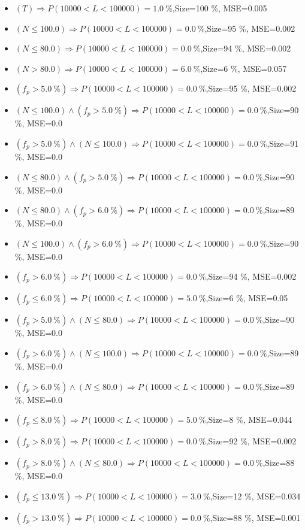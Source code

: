 \documentclass[numbered]{CSL}
\begin{document}
\begin{itemize}
\item $(T) \Rightarrow P(10 000 < L < 100 000) = 1.0~\%$,\hfill Size=100 \%, MSE=0.005
\item $(N \leq 100.0) \Rightarrow P(10 000 < L < 100 000) = 0.0~\%$,\hfill Size=95 \%, MSE=0.002
\item $(N \leq 80.0) \Rightarrow P(10 000 < L < 100 000) = 0.0~\%$,\hfill Size=94 \%, MSE=0.002
\item $(N > 80.0) \Rightarrow P(10 000 < L < 100 000) = 6.0~\%$,\hfill Size=6 \%, MSE=0.057
\item $(f_p > 5.0~\%) \Rightarrow P(10 000 < L < 100 000) = 0.0~\%$,\hfill Size=95 \%, MSE=0.002
\item $(N \leq 100.0) \land (f_p > 5.0~\%) \Rightarrow P(10 000 < L < 100 000) = 0.0~\%$,\hfill Size=90 \%, MSE=0.0
\item $(f_p > 5.0~\%) \land (N \leq 100.0) \Rightarrow P(10 000 < L < 100 000) = 0.0~\%$,\hfill Size=91 \%, MSE=0.0
\item $(N \leq 80.0) \land (f_p > 5.0~\%) \Rightarrow P(10 000 < L < 100 000) = 0.0~\%$,\hfill Size=90 \%, MSE=0.0
\item $(N \leq 80.0) \land (f_p > 6.0~\%) \Rightarrow P(10 000 < L < 100 000) = 0.0~\%$,\hfill Size=89 \%, MSE=0.0
\item $(N \leq 100.0) \land (f_p > 6.0~\%) \Rightarrow P(10 000 < L < 100 000) = 0.0~\%$,\hfill Size=90 \%, MSE=0.0
\item $(f_p > 6.0~\%) \Rightarrow P(10 000 < L < 100 000) = 0.0~\%$,\hfill Size=94 \%, MSE=0.002
\item $(f_p \leq 6.0~\%) \Rightarrow P(10 000 < L < 100 000) = 5.0~\%$,\hfill Size=6 \%, MSE=0.05
\item $(f_p > 5.0~\%) \land (N \leq 80.0) \Rightarrow P(10 000 < L < 100 000) = 0.0~\%$,\hfill Size=90 \%, MSE=0.0
\item $(f_p > 6.0~\%) \land (N \leq 100.0) \Rightarrow P(10 000 < L < 100 000) = 0.0~\%$,\hfill Size=89 \%, MSE=0.0
\item $(f_p > 6.0~\%) \land (N \leq 80.0) \Rightarrow P(10 000 < L < 100 000) = 0.0~\%$,\hfill Size=89 \%, MSE=0.0
\item $(f_p \leq 8.0~\%) \Rightarrow P(10 000 < L < 100 000) = 5.0~\%$,\hfill Size=8 \%, MSE=0.044
\item $(f_p > 8.0~\%) \Rightarrow P(10 000 < L < 100 000) = 0.0~\%$,\hfill Size=92 \%, MSE=0.002
\item $(f_p > 8.0~\%) \land (N \leq 80.0) \Rightarrow P(10 000 < L < 100 000) = 0.0~\%$,\hfill Size=88 \%, MSE=0.0
\item $(f_p \leq 13.0~\%) \Rightarrow P(10 000 < L < 100 000) = 3.0~\%$,\hfill Size=12 \%, MSE=0.034
\item $(f_p > 13.0~\%) \Rightarrow P(10 000 < L < 100 000) = 0.0~\%$,\hfill Size=88 \%, MSE=0.001
\end{itemize}
\end{document}
